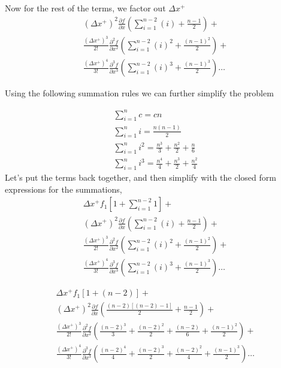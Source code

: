 \documentclass[12pt]{article}
\begin{document}
Now for the rest of the terms, we factor out $\Delta x^+$
\begin{align*}
    (\Delta x^+)^2 \frac{\partial f}{\partial x } \left(
        \sum_{i = 1}^{n - 2} \left( i\right) + \frac{n-1}{2} \right) + \\
        \frac{(\Delta x^+)^3}{2!} \frac{\partial^2 f}{\partial x^2 } \left(
    \sum_{i = 1}^{n - 2} \left( i\right)^2 + \frac{(n-1)^2}{2} \right)  + \\
    \frac{(\Delta x^+)^4}{3!} \frac{\partial^3 f}{\partial x^3 } \left(
    \sum_{i = 1}^{n - 2} \left( i\right)^3 + \frac{(n-1)^3}{2} \right) \dots
\end{align*}

Using the following summation rules we can further simplify the problem


\begin{align*}
    \sum_{i = 1}^{n}c= cn  \\
    \sum_{i = 1}^{n}i =  \frac{n\left( n-1\right)}{2}  \\
    \sum_{i = 1}^{n}i^2  = \frac{n^3}{3} + \frac{n^2}{2} + \frac{n}{6}   \\
    \sum_{i = 1}^{n}i^3  = \frac{n^4}{4} + \frac{n^3}{2} + \frac{n^2}{4}  
\end{align*}
Let's put the terms back together, and then simplify with the closed form 
expressions for the summations,
\begin{align*}
    \Delta x^+ f_1\left[ 1 + \sum_{i=1}^{n-2}1 \right] + \\
    (\Delta x^+)^2 \frac{\partial f}{\partial x } \left(
        \sum_{i = 1}^{n - 2} \left( i\right) + \frac{n-1}{2} \right) + \\
        \frac{(\Delta x^+)^3}{2!} \frac{\partial^2 f}{\partial x^2 } \left(
    \sum_{i = 1}^{n - 2} \left( i\right)^2 + \frac{(n-1)^2}{2} \right)  + \\
    \frac{(\Delta x^+)^4}{3!} \frac{\partial^3 f}{\partial x^3 } \left(
    \sum_{i = 1}^{n - 2} \left( i\right)^3 + \frac{(n-1)^3}{2} \right) \dots
\end{align*}

\begin{align*}
    \Delta x^+ f_1\left[ 1 + (n - 2)  \right] + \\
    (\Delta x^+)^2 \frac{\partial f}{\partial x } \left(
    \frac{(n-2)[\left( n-2 \right)-1]}{2} + \frac{n-1}{2} \right) + \\
        \frac{(\Delta x^+)^3}{2!} \frac{\partial^2 f}{\partial x^2 } \left(
        \frac{(n-2)^3}{3} + \frac{(n-2)^2}{2} + \frac{(n-2)}{6} + \frac{(n-1)^2}{2} \right)  + \\
    \frac{(\Delta x^+)^4}{3!} \frac{\partial^3 f}{\partial x^3 } \left(
    \frac{(n-2)^4}{4} + \frac{(n-2)^3}{2} + \frac{(n-2)^2}{4} + \frac{(n-1)^3}{2} \right) \dots
\end{align*}
\end{document}
